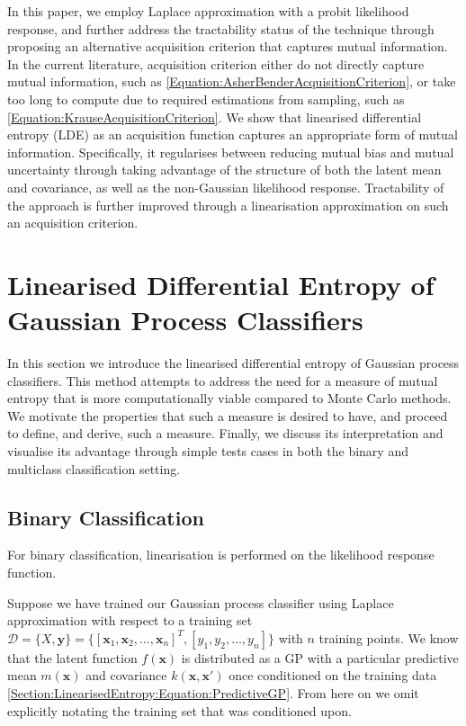 \documentclass{article}
\renewcommand{\vec}[1]{\boldsymbol{#1}}
\begin{document}
	In this paper, we employ Laplace approximation with a probit likelihood response, and further address the tractability status of the technique through proposing an alternative acquisition criterion that captures mutual information. In the current literature, acquisition criterion either do not directly capture mutual information, such as \eqref{Equation:AsherBenderAcquisitionCriterion}, or take too long to compute due to required estimations from sampling, such as \eqref{Equation:KrauseAcquisitionCriterion}. We show that linearised differential entropy (LDE) as an acquisition function captures an appropriate form of mutual information. Specifically, it regularises between reducing mutual bias and mutual uncertainty through taking advantage of the structure of both the latent mean and covariance, as well as the non-Gaussian likelihood response. Tractability of the approach is further improved through a linearisation approximation on such an acquisition criterion.

\section{Linearised Differential Entropy of Gaussian Process Classifiers}
\label{Section:LinearisedEntropy}

	In this section we introduce the linearised differential entropy of Gaussian process classifiers. This method attempts to address the need for a measure of mutual entropy that is more computationally viable compared to Monte Carlo methods. We motivate the properties that such a measure is desired to have, and proceed to define, and derive, such a measure. Finally, we discuss its interpretation and visualise its advantage through simple tests cases in both the binary and multiclass classification setting.
	
	\subsection{Binary Classification}

		For binary classification, linearisation is performed on the likelihood response function.
	
		Suppose we have trained our Gaussian process classifier using Laplace approximation with respect to a training set $\mathcal{D} = \{X, \vec{y}\} = \{[ \vec{x}_{1}, \vec{x}_{2}, \dots, \vec{x}_{n}]^{T}, [y_{1}, y_{2}, \dots, y_{n}]\}$ with $n$ training points. We know that the latent function $f(\vec{x})$ is distributed as a GP with a particular predictive mean $m(\vec{x})$ and covariance $k(\vec{x}, \vec{x}')$ once conditioned on the training data \eqref{Section:LinearisedEntropy:Equation:PredictiveGP}. From here on we omit explicitly notating the training set that was conditioned upon.
		
\end{document}
